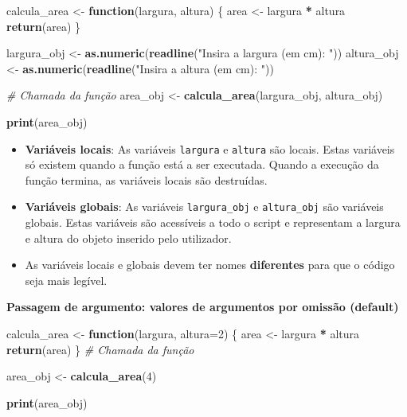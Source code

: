 \documentclass[
]{book}
\newenvironment{Shaded}{\begin{snugshade}}{\end{snugshade}}
\newcommand{\AttributeTok}[1]{\textcolor[rgb]{0.13,0.29,0.53}{#1}}
\newcommand{\CommentTok}[1]{\textcolor[rgb]{0.56,0.35,0.01}{\textit{#1}}}
\newcommand{\ControlFlowTok}[1]{\textcolor[rgb]{0.13,0.29,0.53}{\textbf{#1}}}
\newcommand{\DecValTok}[1]{\textcolor[rgb]{0.00,0.00,0.81}{#1}}
\newcommand{\FunctionTok}[1]{\textcolor[rgb]{0.13,0.29,0.53}{\textbf{#1}}}
\newcommand{\NormalTok}[1]{#1}
\newcommand{\OtherTok}[1]{\textcolor[rgb]{0.56,0.35,0.01}{#1}}
\newcommand{\SpecialCharTok}[1]{\textcolor[rgb]{0.81,0.36,0.00}{\textbf{#1}}}
\newcommand{\StringTok}[1]{\textcolor[rgb]{0.31,0.60,0.02}{#1}}
\theoremstyle{definition}
\theoremstyle{definition}
\theoremstyle{definition}
\theoremstyle{definition}
\theoremstyle{remark}
\begin{document}
\begin{Shaded}
\begin{Highlighting}[]
\NormalTok{calcula\_area }\OtherTok{\textless{}{-}} \ControlFlowTok{function}\NormalTok{(largura, altura) \{}
\NormalTok{  area }\OtherTok{\textless{}{-}}\NormalTok{ largura }\SpecialCharTok{*}\NormalTok{ altura}
  \FunctionTok{return}\NormalTok{(area)}
\NormalTok{\}}

\NormalTok{largura\_obj }\OtherTok{\textless{}{-}} \FunctionTok{as.numeric}\NormalTok{(}\FunctionTok{readline}\NormalTok{(}\StringTok{"Insira a largura (em cm): "}\NormalTok{))}
\NormalTok{altura\_obj }\OtherTok{\textless{}{-}} \FunctionTok{as.numeric}\NormalTok{(}\FunctionTok{readline}\NormalTok{(}\StringTok{"Insira a altura (em cm): "}\NormalTok{))}

\CommentTok{\# Chamada da função}
\NormalTok{area\_obj }\OtherTok{\textless{}{-}} \FunctionTok{calcula\_area}\NormalTok{(largura\_obj, altura\_obj) }

\FunctionTok{print}\NormalTok{(area\_obj)}
\end{Highlighting}
\end{Shaded}

\begin{itemize}
\item
  \textbf{Variáveis locais}: As variáveis \texttt{largura} e \texttt{altura} são locais. Estas variáveis só existem quando a função está a ser executada. Quando a execução da função termina, as variáveis locais são destruídas.
\item
  \textbf{Variáveis globais}: As variáveis \texttt{largura\_obj} e \texttt{altura\_obj} são variáveis globais. Estas variáveis são acessíveis a todo o script e representam a largura e altura do objeto inserido pelo utilizador.
\item
  As variáveis locais e globais devem ter nomes \textbf{diferentes} para que o código seja mais legível.
\end{itemize}

\textbf{Passagem de argumento: valores de argumentos por omissão (default)}

\begin{Shaded}
\begin{Highlighting}[]
\NormalTok{calcula\_area }\OtherTok{\textless{}{-}} \ControlFlowTok{function}\NormalTok{(largura, }\AttributeTok{altura=}\DecValTok{2}\NormalTok{) \{ }
\NormalTok{  area }\OtherTok{\textless{}{-}}\NormalTok{ largura }\SpecialCharTok{*}\NormalTok{ altura  }
  \FunctionTok{return}\NormalTok{(area)}
\NormalTok{\}}
\CommentTok{\# Chamada da função}

\NormalTok{area\_obj }\OtherTok{\textless{}{-}} \FunctionTok{calcula\_area}\NormalTok{(}\DecValTok{4}\NormalTok{) }

\FunctionTok{print}\NormalTok{(area\_obj)}
\end{Highlighting}
\end{Shaded}
\end{document}
